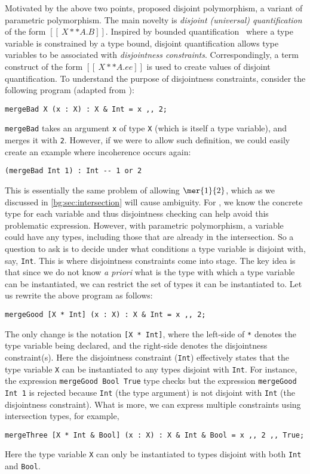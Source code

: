 Motivated by the above two points, \citet{alpuimdisjoint} proposed disjoint
polymorphism, a variant of parametric polymorphism. The
main novelty is \textit{disjoint (universal) quantification} of the form $[[ \ X ** A . B ]]$.
Inspired by bounded quantification~\citep{cardelli1994extension}
where a type variable is constrained by a type bound, disjoint quantification
allows type variables to be associated with \textit{disjointness constraints}.
Correspondingly, a term construct of the form $[[ \ X ** A. ee ]]$ is used to
create values of disjoint quantification.
To understand the purpose of disjointness constraints, consider the following program (adapted from \citet{alpuimdisjoint}):
\begin{lstlisting}
mergeBad X (x : X) : X & Int = x ,, 2;
\end{lstlisting}
\lstinline{mergeBad} takes an argument \lstinline{x} of type \lstinline{X} (which is itself a type variable), and merges it with \lstinline{2}.
However, if we were to allow such definition, we could easily create an example where incoherence occurs again:
\begin{lstlisting}
(mergeBad Int 1) : Int -- 1 or 2
\end{lstlisting}
This is essentially the same problem of allowing $\mer{1}{2}$, which as we
discussed in \cref{bg:sec:intersection} will cause ambiguity. For \namee, we
know the concrete type for each variable and thus disjointness checking can help
avoid this problematic expression. However, with parametric polymorphism, a
variable could have any types,
including those that are already in the intersection. So a question to ask is to
decide under what conditions a type variable is disjoint with, say,
\lstinline{Int}. This is where disjointness constraints come into stage. The key
idea is that since we do not know \textit{a priori} what is the type with which
a type variable can be instantiated, we can restrict the set of types it can be
instantiated to. Let us rewrite the above program as follows:
\begin{lstlisting}
mergeGood [X * Int] (x : X) : X & Int = x ,, 2;
\end{lstlisting}
The only change is the notation \lstinline{[X * Int]}, where the left-side of
\lstinline{*} denotes the type variable being declared, and the right-side
denotes the disjointness constraint(s). Here the disjointness constraint
(\lstinline{Int}) effectively states that the type variable \lstinline{X} can be
instantiated to any types disjoint with \lstinline{Int}. For instance, the expression \lstinline{mergeGood Bool True}
type checks but the expression \lstinline{mergeGood Int 1}
is rejected because \lstinline{Int} (the type argument) is not disjoint with
\lstinline{Int} (the disjointness constraint). What is more, we can express multiple
constraints using intersection types, for example,
\begin{lstlisting}
mergeThree [X * Int & Bool] (x : X) : X & Int & Bool = x ,, 2 ,, True;
\end{lstlisting}
Here the type variable \lstinline{X} can only be instantiated to types disjoint with both
\lstinline{Int} and \lstinline{Bool}.



